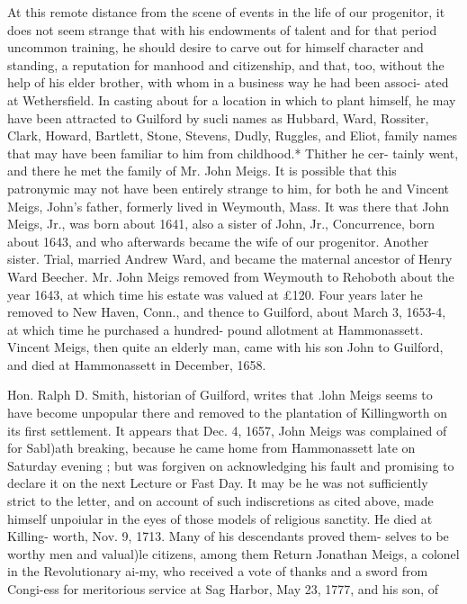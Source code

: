 At this remote distance from the scene of events in the life of 
our progenitor, it does not seem strange that with his endowments 
of talent and for that period uncommon training, he should desire 
to carve out for himself character and standing, a reputation for 
manhood and citizenship, and that, too, without the help of his 
elder brother, with whom in a business way he had been associ- 
ated at Wethersfield. In casting about for a location in which to 
plant himself, he may have been attracted to Guilford by sucli 
names as Hubbard, Ward, Rossiter, Clark, Howard, Bartlett, 
Stone, Stevens, Dudly, Ruggles, and Eliot, family names that 
may have been familiar to him from childhood.* Thither he cer- 
tainly went, and there he met the family of Mr. John Meigs. It 
is possible that this patronymic may not have been entirely strange 
to him, for both he and Vincent Meigs, John's father, formerly 
lived in Weymouth, Mass. It was there that John Meigs, Jr., 
was born about 1641, also a sister of John, Jr., Concurrence, 
born about 1643, and who afterwards became the wife of our 
progenitor. Another sister. Trial, married Andrew Ward, and 
became the maternal ancestor of Henry Ward Beecher. Mr. 
John Meigs removed from Weymouth to Rehoboth about the year 
1643, at which time his estate was valued at £120. Four years 
later he removed to New Haven, Conn., and thence to Guilford, 
about March 3, 1653-4, at which time he purchased a hundred- 
pound allotment at Hammonassett. Vincent Meigs, then quite 
an elderly man, came with his son John to Guilford, and died at 
Hammonassett in December, 1658. 

Hon. Ralph D. Smith, historian of Guilford, writes that .lohn 
Meigs seems to have become unpopular there and removed to the 
plantation of Killingworth on its first settlement. It appears 
that Dec. 4, 1657, John Meigs was complained of for Sabl)ath 
breaking, because he came home from Hammonassett late on 
Saturday evening ; but was forgiven on acknowledging his fault 
and promising to declare it on the next Lecture or Fast Day. It 
may be he was not sufficiently strict to the letter, and on account 
of such indiscretions as cited above, made himself unpoiular in 
the eyes of those models of religious sanctity. He died at Killing- 
worth, Nov. 9, 1713. Many of his descendants proved them- 
selves to be worthy men and valual)le citizens, among them 
Return Jonathan Meigs, a colonel in the Revolutionary ai-my, 
who received a vote of thanks and a sword from Congi-ess for 
meritorious service at Sag Harbor, May 23, 1777, and his son, of 



